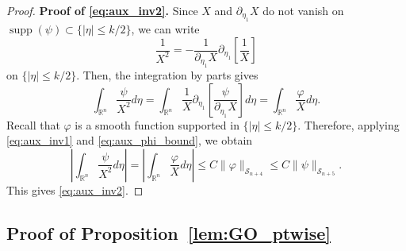 \documentclass[12pt,a4paper]{amsart}
\numberwithin{equation}{section}
\theoremstyle{plain}
\theoremstyle{definition}
\begin{document}
\begin{proof}
\textbf{Proof of \eqref{eq:aux_inv2}.}
Since $X$ and $\partial_{\eta_1} X$ do not vanish on $\operatorname{supp} (\psi) \subset \{|\eta|\leq k/2\}$, we can write 
\begin{equation*}
    \frac{1}{X^2} = - \frac{1}{\partial_{\eta_1}X} \partial_{\eta_1} \left[\frac{1}{X}\right]
\end{equation*}
on $\{|\eta|\leq k/2\}$. Then, the integration by parts gives
\begin{equation*}
    \int_{\mathbb{R}^n}\frac{\psi}{X^2}d\eta
    = \int_{\mathbb{R}^n}\frac{1}{X}
    \partial_{\eta_1}\left[\frac{\psi}{\partial_{\eta_1}X}\right]d\eta = \int_{\mathbb{R}^n}\frac{\varphi}{X}
    d\eta.
\end{equation*}
 Recall that $\varphi$ is a smooth function supported in $\{|\eta|\leq k/2\}$. Therefore, applying \eqref{eq:aux_inv1} and \eqref{eq:aux_phi_bound}, we obtain 
\begin{equation*}
    \left|\int_{\mathbb{R}^n}\frac{\psi}{X^2} d\eta\right| 
    = \left|\int_{\mathbb{R}^n}\frac{\varphi}{X} d\eta\right| 
    \leq C\|\varphi\|_{\mathscr{S}_{n+4}} 
    \leq C\|\psi\|_{\mathscr{S}_{n+5}}.
\end{equation*}
This gives \eqref{eq:aux_inv2}.
\end{proof}

\subsection{Proof of Proposition~\ref{lem:GO_ptwise}}
\end{document}
